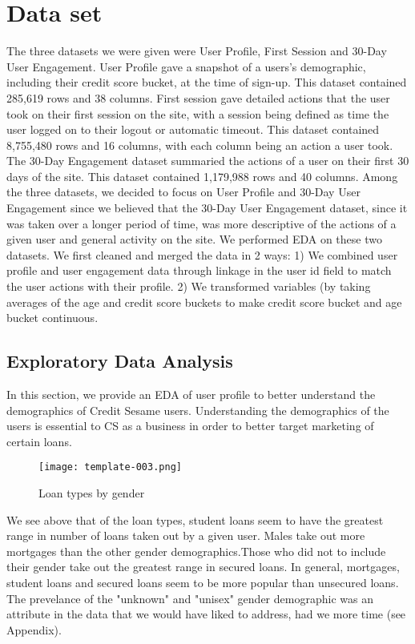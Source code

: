 \documentclass[11pt]{llncs}
\begin{document}
\section{Data set}
\label{sec:datset}
The three datasets we were given were User Profile, First Session and 30-Day User Engagement. User Profile gave a snapshot of a users's demographic, including their credit score bucket, at the time of sign-up. This dataset contained 285,619 rows and 38 columns. First session gave detailed actions that the user took on their first session on the site, with a session being defined as time the user logged on to their logout or automatic timeout. This dataset contained 8,755,480 rows and 16 columns, with each column being an action a user took. The 30-Day Engagement dataset summaried the actions of a user on their first 30 days of the site. This dataset contained 1,179,988 rows and 40 columns. Among the three datasets, we decided to focus on User Profile and 30-Day User Engagement since we believed that the 30-Day User  Engagement dataset, since it was taken over a longer period of time, was more descriptive of the actions of a given user and general activity on the site. We performed EDA on these two datasets.
We first cleaned and merged the data in 2 ways: 
1) We combined user profile and user engagement data through linkage in the user id field to match the user actions with their profile.
2) We transformed variables (by taking averages of the age and credit score buckets to make credit score bucket and age bucket continuous. 


\subsection{Exploratory Data Analysis}
\label{sec:eda}
In this section, we provide an EDA of user profile to better understand the demographics of Credit Sesame users. Understanding the demographics of the users is essential to CS as a business in order to better target marketing of certain loans. 

\begin{figure}
\begin{center}
\texttt{[image: template-003.png]}
\caption{Loan types by gender}
\end{center}
\end{figure}

We see above that of the loan types, student loans seem to have the greatest range in number of loans taken out by a given user. Males take out more mortgages than the other gender demographics.Those who did not to include their gender take out the greatest range in secured loans. In general, mortgages, student loans and secured loans seem to be more popular than unsecured loans. The prevelance of the "unknown" and "unisex" gender demographic was an attribute in the data that we would have liked to address, had we more time (see Appendix).
\end{document}
